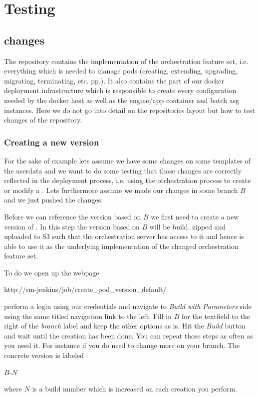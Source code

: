 \chapter{\pod{} Testing}\label{p03:ch02:pod_testing}
	\section{\axceleratepod{} changes}
	The \axceleratepod{} repository contains the implementation of the orchestration feature set, i.e. everything which is needed to manage pods (creating, extending, upgrading, migrating, terminating, etc. pp.). It also contains the part of our docker deployment infrastructure which is responsible to create every configuration needed by the docker host as well as the engine/app container and batch asg instances. Here we do not go into detail on the repositories layout but how to test changes of the repository.
	
		\subsection{Creating a new \axceleratepod{} version}
		For the sake of example lets assume we have some changes on some templates of the userdata and we want to do some testing that those changes are correctly reflected in the deployment process, i.e. using the orchestration process to create or modify a \pod{}. Lets furthermore assume we made our changes in some branch $B$ and we just pushed the changes.
		
		Before we can reference the \axceleratepod{} version based on $B$ we first need to create a new version of \axceleratepod{}. In this step the \axceleratepod{} version based on $B$ will be build, zipped and uploaded to S3 such that the orchestration server has access to it and hence is able to use it as the underlying implementation of the changed orchestration feature set.
		
		To do we open up the webpage
		\begin{center}
			http://rm-jenkins/job/create_pod_version_default/
		\end{center}
		perform a login using our credentials and navigate to \emph{Build with Parameters} side using the same titled navigation link to the left. Fill in $B$ for the textfield to the right of the \emph{branch} label and keep the other options as is. Hit the \emph{Build} button and wait until the \axceleratepod{} creation has been done. You can repeat those steps as often as you need it. For instance if you do need to change more on your branch. The concrete \axceleratepod{} version is labeled
		\begin{center}
			$B$-$N$
		\end{center}
		where $N$ is a build number which is increased on each \axceleratepod{} creation you perform.
		
